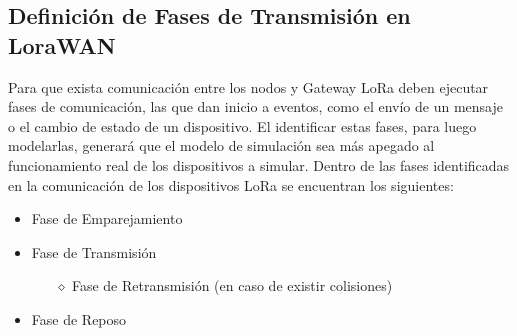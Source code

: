 \begin{justify}
\section{Definición de Fases de Transmisión en LoraWAN}
Para que exista comunicación entre los nodos y Gateway LoRa deben ejecutar fases de comunicación, las que dan inicio a eventos, como el envío de un mensaje o el cambio de estado de un dispositivo. El identificar estas fases, para luego modelarlas, generará que el modelo de simulación sea más apegado al funcionamiento real de los dispositivos a simular. Dentro de las fases identificadas en la comunicación de los dispositivos LoRa se encuentran los siguientes:
\begin{itemize}
\item Fase de Emparejamiento
\item Fase de Transmisión
\begin{itemize}
\item[$\diamond$] Fase de Retransmisión (en caso de existir colisiones)
\end{itemize}
\item Fase de Reposo
\end{itemize}


\end{justify}
